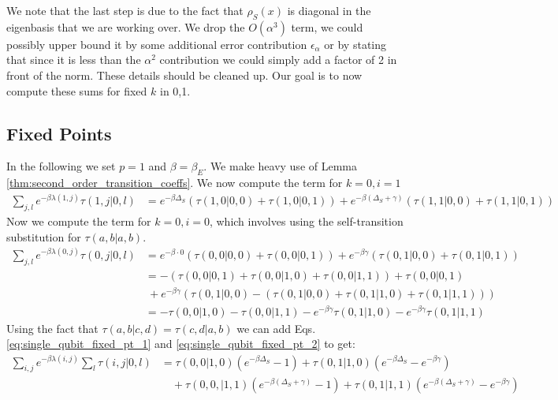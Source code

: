 \documentclass{article}
\newcommand{\parens}[1]{\left( #1 \right)}
\newcommand{\bigo}[1]{O\left( #1 \right)}
\begin{document}
We note that the last step is due to the fact that $\rho_S(x)$ is diagonal in the eigenbasis that we are working over. We drop the $\bigo{\alpha^3}$ term, we could possibly upper bound it by some additional error contribution $\epsilon_{\alpha}$ or by stating that since it is less than the $\alpha^2$ contribution we could simply add a factor of 2 in front of the norm. These details should be cleaned up. Our goal is to now compute these sums for fixed $k$ in 0,1.

\subsection{Fixed Points}

In the following we set $p=1$ and $\beta = \beta_E$.
    We make heavy use of Lemma \ref{thm:second_order_transition_coeffs}. 
    We now compute the term for $k=0, i=1$
    \begin{align}
        \sum_{j, l} e^{-\beta \lambda(1,j)} \tau(1,j| 0, l) &=  e^{-\beta \Delta_S} \parens{\tau(1, 0| 0, 0) + \tau(1, 0 | 0, 1)} +  e^{-\beta (\Delta_S + \gamma)} \parens{\tau(1, 1 | 0, 0) + \tau(1, 1| 0, 1)} \label{eq:single_qubit_fixed_pt_1} 
    \end{align}
    Now we compute the term for $k=0, i= 0$, which involves using the self-transition substitution for $\tau(a,b|a,b)$.
    \begin{align}
        \sum_{j,l} e^{-\beta \lambda(0,j)} \tau(0,j|0,l) &= e^{-\beta \cdot 0} \parens{\tau(0,0| 0,0) + \tau(0,0 | 0,1)} + e^{-\beta \gamma} \parens{\tau(0,1 | 0,0) + \tau(0,1|0,1)} \\
        &= -(\tau(0,0| 0,1) + \tau(0,0| 1,0) + \tau(0,0|1,1)) + \tau(0,0|0,1) \nonumber \\
        &~ + e^{-\beta \gamma} \parens{\tau(0,1|0,0) - (\tau(0,1|0,0) + \tau(0,1| 1,0) + \tau(0,1|1,1))} \\
        &= - \tau(0,0|1,0)  - \tau(0,0|1,1) - e^{-\beta \gamma} \tau(0,1|1,0) - e^{-\beta \gamma} \tau(0,1|1,1) \label{eq:single_qubit_fixed_pt_2}
    \end{align}
    Using the fact that $\tau(a,b|c,d) = \tau(c,d|a,b)$ we can add Eqs. \ref{eq:single_qubit_fixed_pt_1} and \ref{eq:single_qubit_fixed_pt_2} to get:
    \begin{align}
        \sum_{i,j} e^{-\beta \lambda(i,j)} \sum_l \tau(i,j|0,l) &= \tau(0,0|1,0)(e^{-\beta \Delta_S} -1) + \tau(0,1|1,0)(e^{-\beta \Delta_S} - e^{-\beta \gamma}) \nonumber \\
        &\quad + \tau(0,0,| 1,1) (e^{-\beta (\Delta_S + \gamma)} - 1) + \tau(0,1|1,1) (e^{-\beta (\Delta_S + \gamma)} - e^{-\beta \gamma})
    \end{align}
\end{document}

